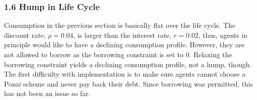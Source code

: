 \documentclass[letterpaper,12pt]{article}
\begin{document}
\subsubsection*{1.6 Hump in Life Cycle}
Consumption in the previous section is basically flat over the life cycle. The discount rate, $\rho = 0.04$, is larger than the interest rate, $r = 0.02$, thus, agents in principle would like to have a declining consumption profile. However, they are not allowed to borrow as the borrowing constraint is set to $0$. \newline
Relaxing the borrowing constraint yields a declining consumption profile, not a hump, though.
The first difficulty with implementation is to make sure agents cannot choose a Ponzi scheme and never pay back their debt. Since borrowing was permitted, this has not been an issue so far.
\end{document}
